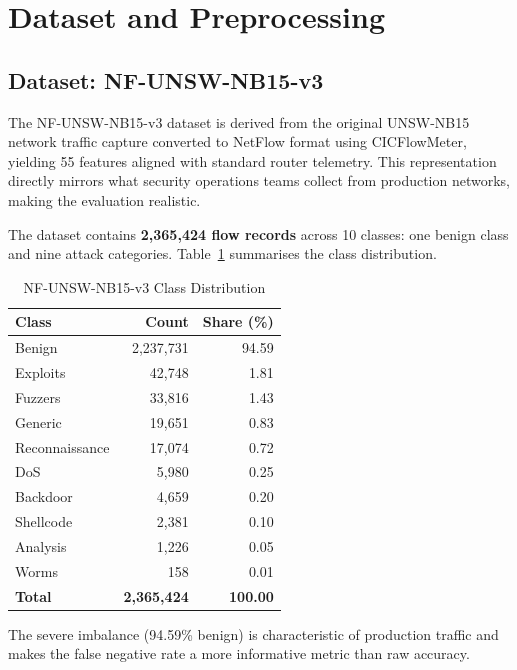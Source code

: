\documentclass[12pt,a4paper]{article}
\begin{document}
\section{Dataset and Preprocessing}
\label{sec:dataset}

\subsection{Dataset: NF-UNSW-NB15-v3}

The NF-UNSW-NB15-v3 dataset \cite{sarhan2021netflow} is derived from the original
UNSW-NB15 network traffic capture \cite{moustafa2015unsw} converted to NetFlow
format using CICFlowMeter, yielding 55 features aligned with standard router
telemetry. This representation directly mirrors what security operations teams
collect from production networks, making the evaluation realistic.

The dataset contains \textbf{2,365,424 flow records} across 10 classes: one benign
class and nine attack categories. Table~\ref{tab:class_dist} summarises the
class distribution.

\begin{table}[h!]
\centering
\caption{NF-UNSW-NB15-v3 Class Distribution}
\label{tab:class_dist}
\begin{tabular}{lrr}
\toprule
\textbf{Class} & \textbf{Count} & \textbf{Share (\%)} \\
\midrule
Benign         & 2,237,731 & 94.59 \\
Exploits       &    42,748 &  1.81 \\
Fuzzers        &    33,816 &  1.43 \\
Generic        &    19,651 &  0.83 \\
Reconnaissance &    17,074 &  0.72 \\
DoS            &     5,980 &  0.25 \\
Backdoor       &     4,659 &  0.20 \\
Shellcode      &     2,381 &  0.10 \\
Analysis       &     1,226 &  0.05 \\
Worms          &       158 &  0.01 \\
\midrule
\textbf{Total} & \textbf{2,365,424} & \textbf{100.00} \\
\bottomrule
\end{tabular}
\end{table}

The severe imbalance (94.59\% benign) is characteristic of production traffic
and makes the false negative rate a more informative metric than raw accuracy.
\end{document}
